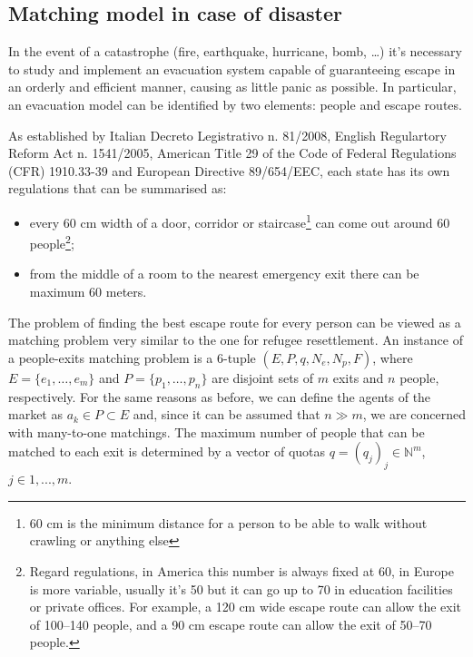 \subsection{Matching model in case of disaster}\label{matching-model-in-case-of-disaster}%


In the event of a catastrophe (fire, earthquake, hurricane, bomb, \ldots) it's necessary to study and implement an evacuation system capable of guaranteeing escape in an orderly and efficient manner, causing as little panic as possible. In particular, an evacuation model can be identified by two elements: people and escape routes.

\nocite{it-81-2008,uk-1541-2005,usa-1910-1974,cee-654-1989}%
As established by Italian Decreto Legistrativo n. 81/2008, English Regulartory Reform Act n. 1541/2005, American Title 29 of the Code of Federal Regulations (CFR)
1910.33-39 and European Directive 89/654/EEC, each state has its own regulations that can be summarised as:
\begin{itemize}
    \item every 60 cm width of a door, corridor or staircase\footnote{60 cm is the minimum distance for a person to be able to walk without crawling or anything else} can come out around 60 people\footnote{Regard regulations, in America this number is always fixed at 60, in Europe is more variable, usually it's 50 but it can go up to 70 in education facilities or private offices. For example, a 120 cm wide escape route can allow the exit of 100--140 people, and a 90 cm escape route can allow the exit of 50--70 people.};
    \item from the middle of a room to the nearest emergency exit there can be maximum 60 meters.
\end{itemize}

The problem of finding the best escape route for every person can be viewed as a matching problem very similar to the one for refugee resettlement. An instance of a people-exits matching problem is a 6-tuple \((E, P, q, N_e, N_p, F)\), where \(E = \{e_1, \dots, e_m\}\) and \(P = \{p_1, \dots, p_n\}\) are disjoint sets of \(m\) exits and \(n\) people, respectively.
For the same reasons as before, we can define the agents of the market as \(a_k \in P \subset E\) and, since it can be assumed that \(n \gg m\), we are concerned with many-to-one matchings.
The maximum number of people that can be matched to each exit is determined by a vector of quotas \(q = (q_j)_j \in \mathbb{N}^m\), \(j\in {1,...,m}\).

